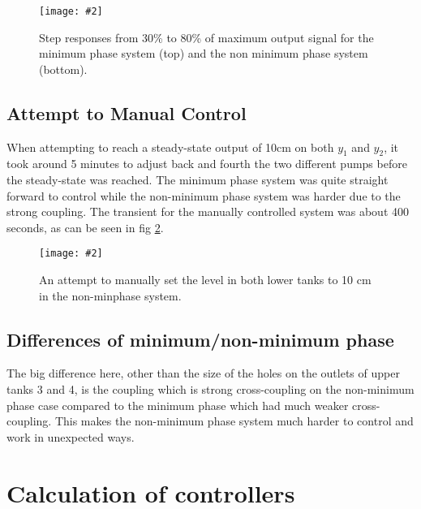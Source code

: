 \documentclass[a4paper,12pt,oneside,onecolumn]{article}
\newcommand{\image}[3][width=.6\columnwidth]{
	\begin{figure}[h!]
		\centering
	    \texttt{[image: \#2]}
		\caption{#3}
		\label{fig:#2}
	\end{figure}
}
\begin{document}
\image{Step-responses.eps}{Step responses from 30\% to 80\% of maximum output signal for the minimum phase system (top) and the non minimum phase system (bottom).}


\subsection{Attempt to Manual Control}
When attempting to reach a steady-state output of 10cm on both $y_1$ and $y_2$, it took around 5 minutes to adjust back and fourth the two different pumps before the steady-state was reached. The minimum phase system was quite straight forward to control while the non-minimum phase system was harder due to the strong coupling. The transient for the manually controlled system was about 400 seconds, as can be seen in fig \ref{fig:transient-ctrl-nmf.eps}.
\image{transient-ctrl-nmf.eps}{An attempt to manually set the level in both lower tanks to 10 cm in the non-minphase system.}
 
 
\subsection{Differences of minimum/non-minimum phase}
The big difference here, other than the size of the holes on the outlets of upper tanks 3 and 4, is the coupling which is strong cross-coupling on the non-minimum phase case compared to the minimum phase which had much weaker cross-coupling. This makes the non-minimum phase system much harder to control and work in unexpected ways.

\section{Calculation of controllers}
\end{document}
